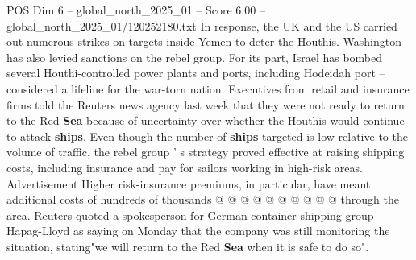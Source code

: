 \begin{textsample}{POS Dim 6 – global\_north\_2025\_01 – Score 6.00 – global\_north\_2025\_01/120252180.txt}
In response, the UK and the US carried out numerous strikes on targets inside Yemen to deter the Houthis.
Washington has also levied sanctions on the rebel group.
For its part, Israel has bombed several Houthi-controlled power plants and ports, including Hodeidah port -- considered a lifeline for the war-torn nation.
Executives from retail and insurance firms told the Reuters news agency last week that they were not ready to return to the Red \textbf{Sea} because of uncertainty over whether the Houthis would continue to attack \textbf{ships}.
Even though the number of \textbf{ships} targeted is low relative to the volume of traffic, the rebel group ' s strategy proved effective at raising shipping costs, including insurance and pay for sailors working in high-risk areas.
Advertisement Higher risk-insurance premiums, in particular, have meant additional costs of hundreds of thousands @ @ @ @ @ @ @ @ @ @ through the area.
Reuters quoted a spokesperson for German container shipping group Hapag-Lloyd as saying on Monday that the company was still monitoring the situation, stating"we will return to the Red \textbf{Sea} when it is safe to do so".

\end{textsample}
